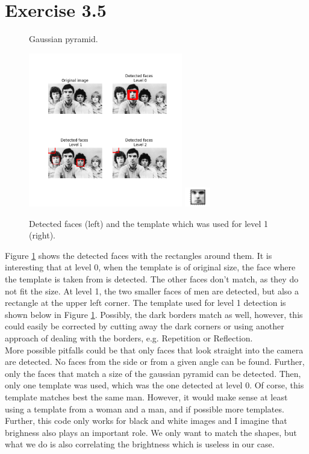 \documentclass[a4paper,8pt]{extarticle}\usepackage[]{graphicx}\usepackage[]{color}
\begin{document}
\section{Exercise 3.5}
\begin{figure}
  \caption{Gaussian pyramid.}
  \centering
    \includegraphics[width=0.6\textwidth]{figs/face_detection.png}
    \includegraphics[width=0.1\textwidth]{figs/temp_level1.png}
  \label{fig:face}
  \caption{Detected faces (left) and the template which was used for level 1 (right).}
\end{figure}

Figure \ref{fig:face} shows the detected faces with the rectangles around them. It is interesting that at level 0, when the template is of original size, the face where the template is taken from is detected. The other faces don't match, as they do not fit the size. At level 1, the two smaller faces of men are detected, but also a rectangle at the upper left corner. The template used for level 1 detection is shown below in Figure \ref{fig:face}. Possibly, the dark borders match as well, however, this could easily be corrected by cutting away the dark corners or using another approach of dealing with the borders, e.g. Repetition or Reflection. \\
More possible pitfalls could be that only faces that look straight into the camera are detected. No faces from the side or from a given angle can be found. Further, only the faces that match a size of the gaussian pyramid can be detected. Then, only one template was used, which was the one detected at level 0. Of corse, this template matches best the same man. However, it would make sense at least using a template from a woman and a man, and if possible more templates. Further, this code only works for black and white images and I imagine that brighness also plays an important role. We only want to match the shapes, but what we do is also correlating the brightness which is useless in our case. \\ \\
\end{document}
